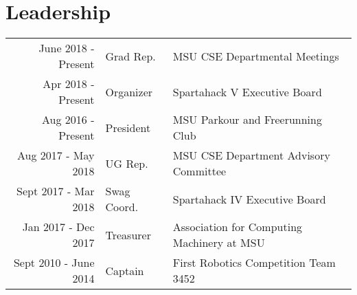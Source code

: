 \documentclass[]{deedy-resume-openfont-rileyannis}
\begin{document}
\begin{minipage}[t]{0.66\textwidth}


\section{Leadership} 

\begin{tabular}{rll}
June 2018 - Present & Grad Rep. & MSU CSE Departmental Meetings\\
Apr 2018 - Present & Organizer & Spartahack V Executive Board\\
Aug 2016 - Present & President & MSU Parkour and Freerunning Club\\
Aug 2017 - May 2018 & UG Rep. & MSU CSE Department Advisory Committee\\
Sept 2017 - Mar 2018 & Swag Coord. & Spartahack IV Executive Board\\
Jan 2017 - Dec 2017 & Treasurer & Association for Computing Machinery at MSU\\
Sept 2010 - June 2014 & Captain & First Robotics Competition Team 3452\\
\end{tabular}
\sectionsep

\end{minipage} 
\end{document}
